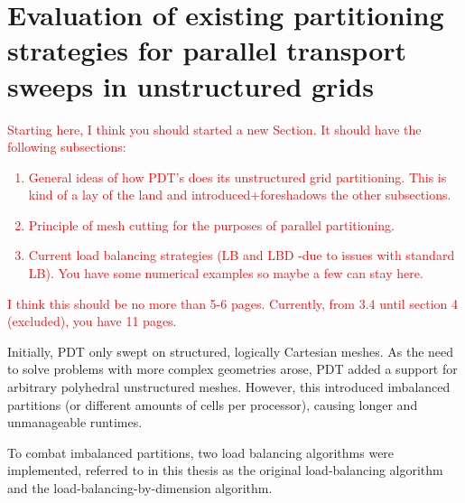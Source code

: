 \documentclass[times,final]{elsarticle}
\newcommand{\tcr}[1]{\textcolor{red}{#1}}
\begin{document}
\section{Evaluation of existing partitioning strategies for parallel transport sweeps in unstructured grids}\label{cha:lb}
\tcr{Starting here, I think you should started a new Section. It should have the following subsections:
\begin{enumerate}
\item General ideas of how PDT's does its unstructured grid partitioning. This is kind of a lay of the land and introduced+foreshadows the other subsections.
\item Principle of mesh cutting for the purposes of parallel partitioning. 
\item Current load balancing strategies (LB and LBD -due to issues with standard LB). You have some numerical examples so maybe a few can stay here.
\end{enumerate}
I think this should be no more than 5-6 pages. Currently, from 3.4 until section 4 (excluded), you have 11 pages.
}
 
Initially, PDT only swept on structured, logically Cartesian meshes. As the need to solve problems with more complex geometries arose, PDT added a support for arbitrary polyhedral unstructured meshes. However, this introduced imbalanced partitions (or different amounts of cells per processor), causing longer and unmanageable runtimes.

To combat imbalanced partitions, two load balancing algorithms were implemented, referred to in this thesis as the original load-balancing algorithm \cite{mastersthesis,mc2017} and the load-balancing-by-dimension algorithm.
\end{document}
